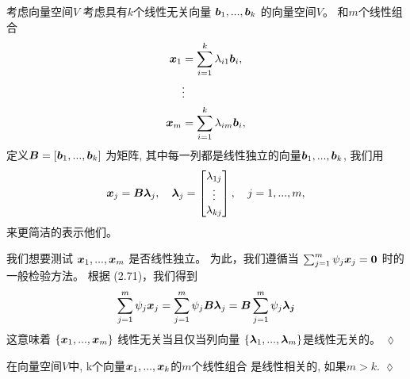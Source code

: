 \begin{remark}
    考虑向量空间$V$
    考虑具有$k$个线性无关向量
    $\boldsymbol{b}_1,...,\boldsymbol{b}_k$
    的向量空间$V$。
    和$m$个线性组合
    \begin{equation}
    \begin{aligned}
        \boldsymbol{x}_1 &= \sum_{i=1}^{k}\lambda_{i1}\boldsymbol{b}_i, \\
                         &\vdots \\
        \boldsymbol{x}_m &= \sum_{i=1}^{k}\lambda_{im}\boldsymbol{b}_i, \\
    \end{aligned}
    \end{equation}
    定义$\boldsymbol{B} = [\boldsymbol{b}_1,...,\boldsymbol{b}_k]$
    为矩阵, 其中每一列都是线性独立的向量$\boldsymbol{b}_1,...,\boldsymbol{b}_k$, 我们用
    \begin{equation}
        \boldsymbol{x}_j = \boldsymbol{B\lambda}_j,
        \quad
        \boldsymbol{\lambda}_j =
        \begin{bmatrix}
            \lambda_{1j} \\
            \vdots \\
            \lambda_{kj} \\
        \end{bmatrix},
        \quad
        j = 1,..., m,
    \end{equation}
    来更简洁的表示他们。

    我们想要测试
    $\boldsymbol{x}_1,..., \boldsymbol{x}_m$
    是否线性独立。
    为此，我们遵循当
    $\sum_{j=1}^{m}\psi_j\boldsymbol{x}_j = \boldsymbol{0}$
    时的一般检验方法。
    根据 (2.71)，我们得到
    \begin{equation}
       \sum_{j=1}^{m}\psi_j\boldsymbol{x}_j
       =
       \sum_{j=1}^{m}\psi_j\boldsymbol{B}\boldsymbol{\lambda}_j
       =
       \boldsymbol{B}\sum_{j=1}^{m}\psi_j\boldsymbol{\lambda_j}
    \end{equation}
    这意味着
    $\{\boldsymbol{x}_1,..., \boldsymbol{x}_m\}$
    线性无关当且仅当列向量
    $\{\boldsymbol{\lambda}_1,..., \boldsymbol{\lambda}_m\}$是线性无关的。
    \hfill $\lozenge$
\end{remark}

\begin{remark}
    在向量空间$V$中,
    k个向量$\boldsymbol{x}_1,...,\boldsymbol{x}_k$的$m$个线性组合
    是线性相关的, 如果$m > k$. \hfill $\lozenge$
\end{remark}

